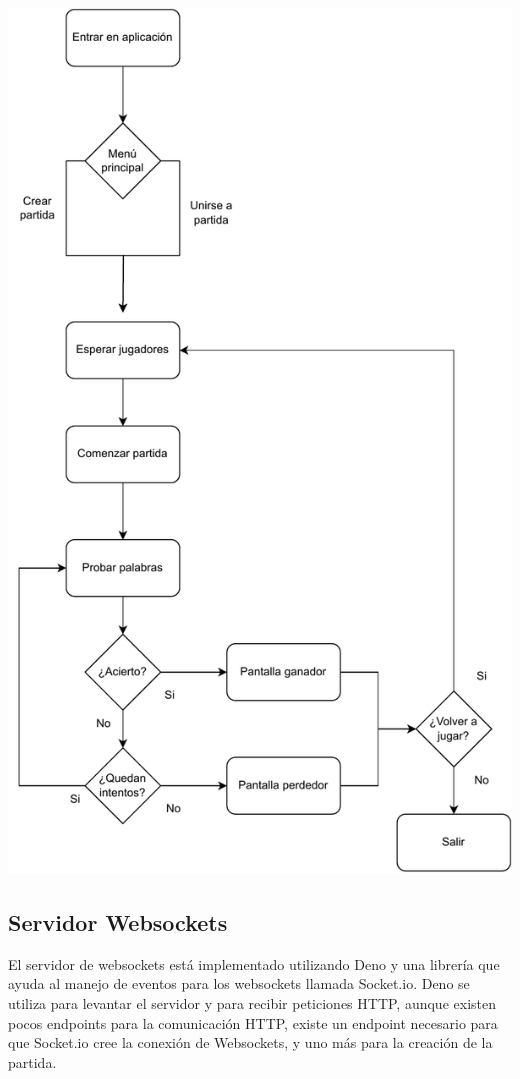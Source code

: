 \begin{center}
	\includegraphics[clip=true,width=\textwidth]{./diagrams/webapp_flow.pdf}
\end{center}


\subsection{Servidor Websockets}

El servidor de websockets está implementado utilizando Deno y una librería que ayuda al manejo de eventos para los websockets llamada Socket.io. Deno se utiliza para levantar el servidor y para recibir peticiones HTTP, aunque existen pocos endpoints para la comunicación HTTP, existe un endpoint necesario para que Socket.io cree la conexión de Websockets, y uno más para la creación de la partida.

